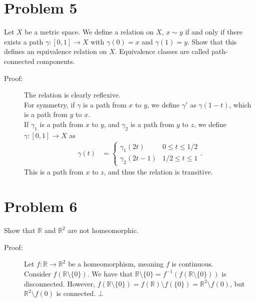 \documentclass[8pt]{extarticle}
\newcommand{\R}{\mathbb{R}}
\begin{document}
  \section{Problem 5}%
  Let $X$ be a metric space. We define a relation on $X$, $x\sim y$ if and only if there exists a path $\gamma: [0,1] \rightarrow X$ with $\gamma(0) = x$ and $\gamma(1) = y$. Show that this defines an equivalence relation on $X$. Equivalence classes are called path-connected components.
  \begin{description}
    \item[Proof:] The relation is clearly reflexive.\\

      For symmetry, if $\gamma$ is a path from $x$ to $y$, we define $\gamma'$ as $\gamma(1-t)$, which is a path from $y$ to $x$.\\

      If $\gamma_1$ is a path from $x$ to $y$, and $\gamma_2$ is a path from $y$ to $z$, we define $\gamma: [0,1]\rightarrow X$ as
      \begin{align*}
        \gamma(t) &= \begin{cases}
          \gamma_1(2t) & 0 \leq t \leq 1/2\\
          \gamma_2(2t - 1) & 1/2 \leq t \leq 1
        \end{cases}.
      \end{align*}
      This is a path from $x$ to $z$, and thus the relation is transitive.
  \end{description}
  \section{Problem 6}%
  Show that $\R$ and $\R^2$ are not homeomorphic.
  \begin{description}
    \item[Proof:] Let $f: \R\rightarrow \R^2$ be a homeomorphism, meaning $f$ is continuous.\\

      Consider $f(\R\setminus \{0\})$. We have that $\R\setminus \{0\} = f^{-1}\left(f(\R\setminus \{0\})\right)$ is disconnected. However, $f(\R\setminus \{0\}) = f(\R)\setminus f(\{0\}) = \R^2\setminus f(0)$, but $\R^2\setminus f(0)$ is connected. $\bot$
  \end{description}
\end{document}
